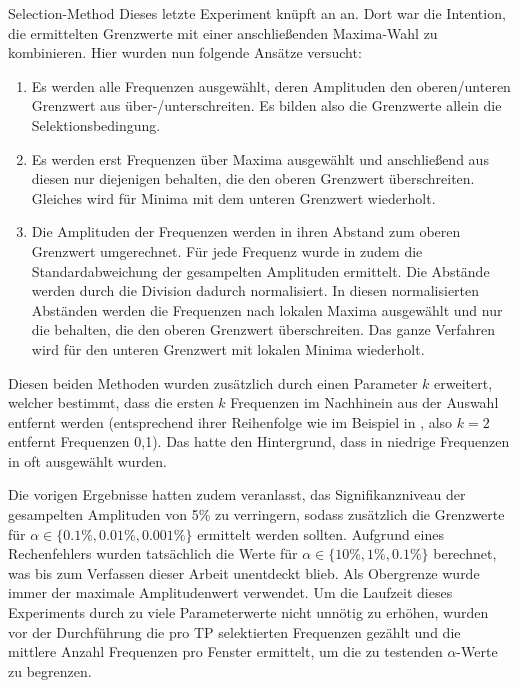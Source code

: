     \begin{experiment}{Selection-Method} %
        \label{exp:selection_method}
        Dieses letzte Experiment knüpft an  an. Dort war die Intention, die ermittelten Grenzwerte mit einer anschließenden Maxima-Wahl zu kombinieren. Hier wurden nun folgende Ansätze versucht:
    
        \begin{enumerate}
            \item Es werden alle Frequenzen ausgewählt, deren Amplituden den oberen/unteren Grenzwert aus  über-/unterschreiten. Es bilden also die Grenzwerte allein die Selektionsbedingung.
            \item Es werden erst Frequenzen über Maxima ausgewählt und anschließend aus diesen nur diejenigen behalten, die den oberen Grenzwert überschreiten. Gleiches wird für Minima mit dem unteren Grenzwert wiederholt.
            \item Die Amplituden der Frequenzen werden in ihren Abstand zum oberen Grenzwert umgerechnet. Für jede Frequenz wurde in  zudem die Standardabweichung der gesampelten Amplituden ermittelt. Die Abstände werden durch die Division dadurch normalisiert. In diesen normalisierten Abständen werden die Frequenzen nach lokalen Maxima ausgewählt und nur die behalten, die den oberen Grenzwert überschreiten. Das ganze Verfahren wird für den unteren Grenzwert mit lokalen Minima wiederholt.
        \end{enumerate}

        Diesen beiden Methoden wurden zusätzlich durch einen Parameter $k$ erweitert, welcher bestimmt, dass die ersten $k$ Frequenzen im Nachhinein aus der Auswahl entfernt werden (entsprechend ihrer Reihenfolge wie im Beispiel in , also $k=2$ entfernt Frequenzen 0,1). Das hatte den Hintergrund, dass in niedrige Frequenzen in  oft ausgewählt wurden.

        Die vorigen Ergebnisse hatten zudem veranlasst, das Signifikanzniveau der gesampelten Amplituden von 5\% zu verringern, sodass zusätzlich die Grenzwerte für $\alpha \in \{0.1\%, 0.01\%, 0.001\%\}$ ermittelt werden sollten. Aufgrund eines Rechenfehlers wurden tatsächlich die Werte für $\alpha \in \{10\%, 1\%, 0.1\%\}$ berechnet, was bis zum Verfassen dieser Arbeit unentdeckt blieb. Als Obergrenze wurde immer der maximale Amplitudenwert verwendet. Um die Laufzeit dieses Experiments durch zu viele Parameterwerte nicht unnötig zu erhöhen, wurden vor der Durchführung die pro \ac{TP} selektierten Frequenzen gezählt und die mittlere Anzahl Frequenzen pro Fenster ermittelt, um die zu testenden $\alpha$-Werte zu begrenzen.


\end{experiment}
